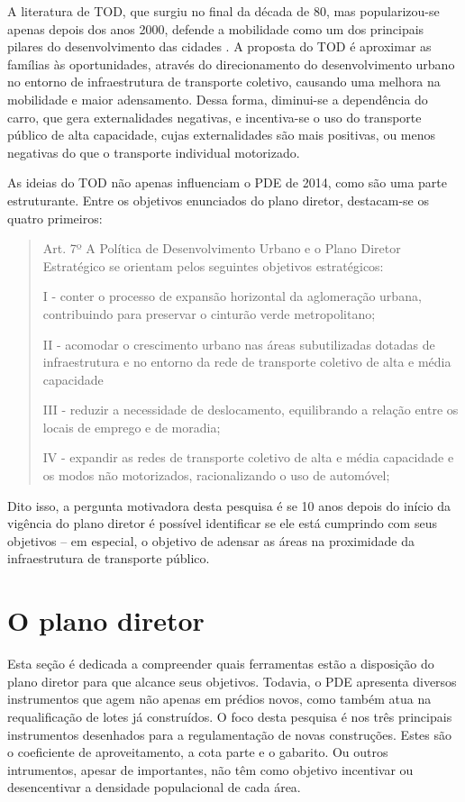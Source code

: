 A literatura de TOD, que surgiu no final da década de 80, mas popularizou-se apenas depois dos anos 2000, defende a mobilidade como um dos principais pilares do desenvolvimento das cidades \cite{Ibraeva2020}. A proposta do TOD é aproximar as famílias às oportunidades, através do direcionamento do desenvolvimento urbano no entorno de infraestrutura de transporte coletivo, causando uma melhora na mobilidade e maior adensamento. Dessa forma, diminui-se a dependência do carro, que gera externalidades negativas, e incentiva-se o uso do transporte público de alta capacidade, cujas externalidades são mais positivas, ou menos negativas do que o transporte individual motorizado.

As ideias do TOD não apenas influenciam o PDE de 2014, como são uma parte estruturante. Entre os objetivos enunciados do plano diretor, destacam-se os quatro primeiros:

\begin{quote}
    Art. 7º A Política de Desenvolvimento Urbano 
    e o Plano Diretor Estratégico se orientam pelos 
    seguintes objetivos estratégicos:

    I - conter o processo de expansão horizontal da aglomeração urbana, contribuindo para preservar o cinturão verde metropolitano;

    II - acomodar o crescimento urbano nas áreas subutilizadas dotadas de infraestrutura e no entorno da rede de transporte coletivo de alta e média capacidade

    III - reduzir a necessidade de deslocamento, equilibrando a relação entre os locais de emprego e de moradia;

    IV - expandir as redes de transporte coletivo de alta e média capacidade e os modos não motorizados, racionalizando o uso de automóvel;
\end{quote}

Dito isso, a pergunta motivadora desta pesquisa é se 10 anos depois do início da vigência do plano diretor é possível identificar se ele está cumprindo com seus objetivos -- em especial, o objetivo de adensar as áreas na proximidade da infraestrutura de transporte público.

\section{O plano diretor}
\label{sec:plano-diretor}

Esta seção é dedicada a compreender quais ferramentas estão a disposição do plano diretor para que alcance seus objetivos. Todavia, o PDE apresenta diversos instrumentos que agem não apenas em prédios novos, como também atua na requalificação de lotes já construídos. O foco desta pesquisa é nos três principais instrumentos desenhados para a regulamentação de novas construções. Estes são o coeficiente de aproveitamento, a cota parte e o gabarito. Ou outros intrumentos, apesar de importantes, não têm como objetivo incentivar ou desencentivar a densidade populacional de cada área. 

